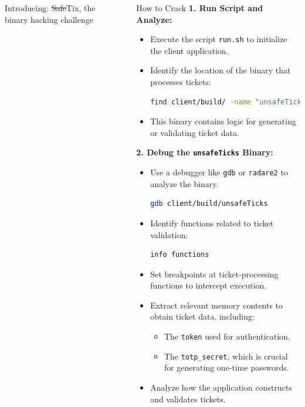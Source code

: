 \documentclass[final,dvipsnames]{beamer}
\newlength{\sepwidth}
\newlength{\colwidth}
\newcommand{\separatorcolumn}{\begin{column}{\sepwidth}\end{column}}
\begin{document}
\begin{frame}[t, fragile]
\begin{columns}[t]
\begin{column}{\colwidth}
\begin{block}{Introducing: \sout{Safe}Tix, the binary hacking challenge}
	\end{block}

\end{column}

\separatorcolumn

\begin{column}{\colwidth}

    \begin{block}{How to Crack}
        \footnotesize        
        \textbf{1. Run Script and Analyze:}
        \begin{itemize}
            \item Execute the script \texttt{run.sh} to initialize the client application.
            \item Identify the location of the binary that processes tickets:
            \begin{lstlisting}[language=bash]
            find client/build/ -name "unsafeTicks"
            \end{lstlisting}
            \item This binary contains logic for generating or validating ticket data.
        \end{itemize}
        
        \textbf{2. Debug the \texttt{unsafeTicks} Binary:}
        \begin{itemize}
            \item Use a debugger like \texttt{gdb} or \texttt{radare2} to analyze the binary.
            \begin{lstlisting}[language=bash]
            gdb client/build/unsafeTicks
            \end{lstlisting}
            \item Identify functions related to ticket validation:
            \begin{lstlisting}[language=bash]
            info functions
            \end{lstlisting}
            \item Set breakpoints at ticket-processing functions to intercept execution.
            \item Extract relevant memory contents to obtain ticket data, including:
            \begin{itemize}
                \item The \texttt{token} used for authentication.
                \item The \texttt{totp\_secret}, which is crucial for generating one-time passwords.
            \end{itemize}
            \item Analyze how the application constructs and validates tickets.
        \end{itemize}


\end{block}
\end{column}
\end{columns}
\end{frame}
\end{document}
